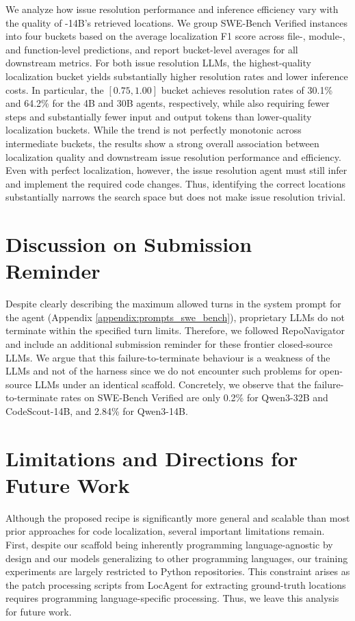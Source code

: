 We analyze how issue resolution performance and inference efficiency vary with the quality of \methodname-14B's retrieved locations. We group SWE-Bench Verified instances into four buckets based on the average localization F1 score across file-, module-, and function-level predictions, and report bucket-level averages for all downstream metrics. For both issue resolution LLMs, the highest-quality localization bucket yields substantially higher resolution rates and lower inference costs. In particular, the $[0.75,1.00]$ bucket achieves resolution rates of 30.1\% and 64.2\% for the 4B and 30B agents, respectively, while also requiring fewer steps and substantially fewer input and output tokens than lower-quality localization buckets. While the trend is not perfectly monotonic across intermediate buckets, the results show a strong overall association between localization quality and downstream issue resolution performance and efficiency. Even with perfect localization, however, the issue resolution agent must still infer and implement the required code changes. Thus, identifying the correct locations substantially narrows the search space but does not make issue resolution trivial.


\section{Discussion on Submission Reminder}\label{app:reminder_discuss}
Despite clearly describing the maximum allowed turns in the system prompt for the agent (Appendix \ref{appendix:prompts_swe_bench}), proprietary LLMs do not terminate within the specified turn limits. Therefore, we followed RepoNavigator \citep{zhang2025one}
and include an additional submission reminder for these frontier closed-source LLMs. We argue that this failure-to-terminate behaviour is a weakness of the LLMs and not of the harness  since we do not encounter such problems for open-source LLMs under an identical scaffold. Concretely, we observe that the failure-to-terminate rates on SWE-Bench Verified are only 0.2\% for Qwen3-32B and CodeScout-14B, and 2.84\% for Qwen3-14B.

\section{Limitations and Directions for Future Work}\label{appendix:future_work}
Although the proposed \methodname recipe is significantly more general and scalable than most prior approaches for code localization, several important limitations remain. First, despite our scaffold being inherently programming language-agnostic by design and our models generalizing to other programming languages, our training experiments are largely restricted to Python repositories. This constraint  arises as the patch processing scripts from LocAgent \citep{chen-etal-2025-locagent} for extracting ground-truth locations requires programming language-specific processing. Thus, we leave this analysis for future work.

